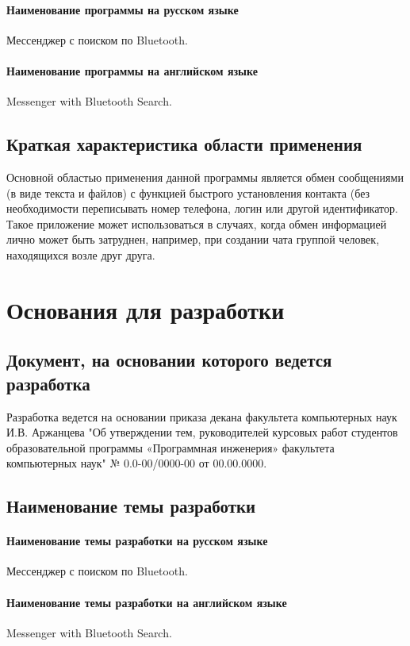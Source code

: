 \documentclass[techtask]{espd}
\begin{document}
\paragraph{Наименование программы на русском языке}
Мессенджер с поиском по Bluetooth.
\paragraph{Наименование программы на английском языке}
Messenger with Bluetooth Search.

\subsection{Краткая характеристика области применения}
Основной областью применения данной программы является обмен сообщениями (в виде текста и файлов) с функцией быстрого установления контакта (без необходимости переписывать номер телефона, логин или другой идентификатор. Такое приложение может использоваться в случаях, когда обмен информацией лично может быть затруднен, например, при создании чата группой человек, находящихся возле друг друга.

\section{Основания для разработки}
\subsection{Документ, на основании которого ведется разработка}
Разработка ведется на основании приказа декана факультета компьютерных наук И.В. Аржанцева "Об утверждении тем, руководителей курсовых работ студентов образовательной программы «Программная инженерия» факультета компьютерных наук" № 0.0-00/0000-00 от 00.00.0000.

\subsection{Наименование темы разработки}
\paragraph{Наименование темы разработки на русском языке}
Мессенджер с поиском по Bluetooth.

\paragraph{Наименование темы разработки на английском языке}
Messenger with Bluetooth Search.
\end{document}
